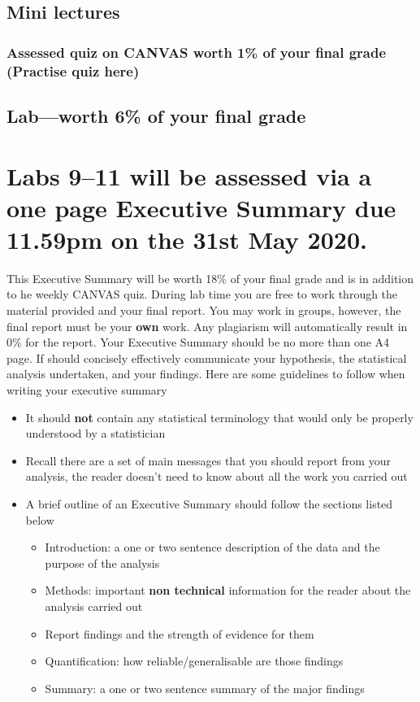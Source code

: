 \documentclass{article}
\begin{document}
\subsection*{Mini lectures}

\subsubsection*{Assessed quiz on CANVAS worth 1\% of your final grade (Practise quiz here)}

\subsection*{Lab---worth 6\% of your final grade}

\newpage

\section*{Labs 9--11 will be assessed via a one page Executive Summary due 11.59pm on the 31st May 2020.}

This Executive Summary will be worth  18\% of your final grade and is in addition to he weekly CANVAS quiz. During lab time you are free to work through the material provided and your final report. You may work in groups, however, the final report must be your \textbf{own} work. Any plagiarism will automatically result in 0\% for the report. Your Executive Summary should be no more than one A4 page. If should concisely effectively communicate your hypothesis, the statistical analysis undertaken, and your findings. Here are some guidelines to follow when writing your executive summary
\begin{itemize}
\item  It should \textbf{not} contain any statistical terminology that would only be properly understood by a statistician
  \item Recall there are a set of main messages that you should report from your analysis, the reader doesn't need to know about all the work you carried out
\item A brief outline of an Executive Summary should follow the sections listed below
  \begin{itemize}
\item Introduction: a one or two sentence description of the data and the purpose of the analysis
\item Methods: important \textbf{non technical} information for the reader about the analysis carried out
\item Report findings and the strength of evidence for them
\item Quantification: how reliable/generalisable are those findings
  \item Summary: a one or two sentence summary of the major findings
  \end{itemize}
\end{itemize}
\end{document}
